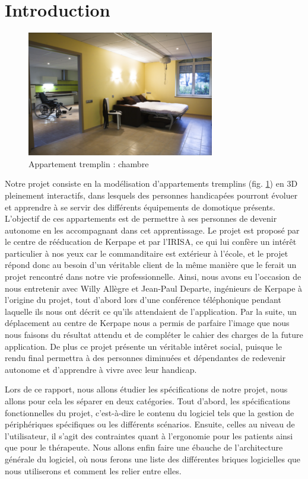 \section{Introduction}

\begin{figure}
	\centering
	\includegraphics[scale=1]{1-PreEtude/img/appt_tremplin_intro.png}
	\caption{Appartement tremplin : chambre}
	\label{appart}
\end{figure}


Notre projet consiste en la modélisation d'appartements tremplins (fig. \ref{appart}) en 3D pleinement interactifs, dans lesquels des personnes handicapées pourront évoluer et apprendre à se servir des différents équipements de domotique présents. L'objectif de ces appartements est de permettre à ses personnes de devenir autonome en les accompagnant dans cet apprentissage.
Le projet est proposé par le centre de rééducation de Kerpape et par l'IRISA, ce qui lui confère un intérêt particulier à nos yeux car le commanditaire est extérieur à l'école, et le projet répond donc au besoin d'un véritable client de la même manière que le ferait un projet rencontré dans notre vie professionnelle. 
Ainsi, nous avons eu l'occasion de nous entretenir avec Willy Allègre et Jean-Paul Departe, ingénieurs de Kerpape à l'origine du projet, tout d'abord lors d'une conférence téléphonique pendant laquelle ils nous ont décrit ce qu'ils attendaient de l'application. Par la suite, un déplacement au centre de Kerpape nous a permis de parfaire l'image que nous nous faisons du résultat attendu et de compléter le cahier des charges de la future application. 
De plus ce projet présente un véritable intêret social, puisque le rendu final permettra à des personnes diminuées et dépendantes de redevenir autonome et d'apprendre à vivre avec leur handicap.
\newline

Lors de ce rapport, nous allons étudier les spécifications de notre projet, nous allons pour cela les séparer en deux catégories. Tout d'abord, les spécifications fonctionnelles du projet, c'est-à-dire le contenu du logiciel tels que la gestion de périphériques spécifiques ou les différents scénarios. Ensuite, celles au niveau de l'utilisateur, il s'agit des contraintes quant à l'ergonomie pour les patients ainsi que pour le thérapeute. Nous allons enfin faire une ébauche de l'architecture générale du logiciel, où nous ferons une liste des différentes briques logicielles que nous utiliserons et comment les relier entre elles.


